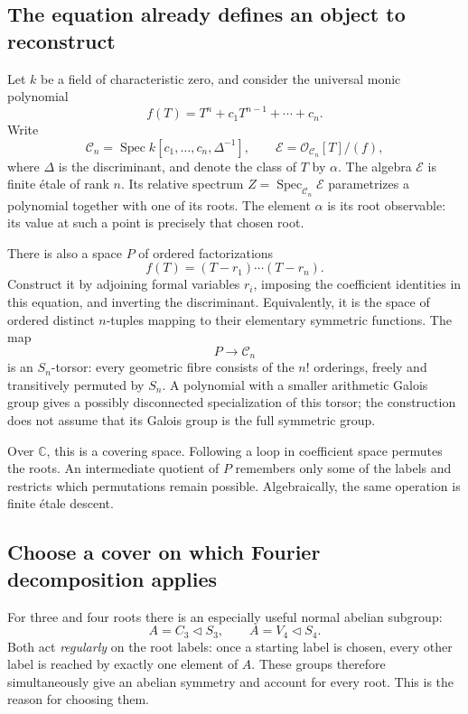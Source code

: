 \documentclass[11pt]{article}
\theoremstyle{remark}
\newcommand{\C}{\mathbb C}
\newcommand{\Spec}{\operatorname{Spec}}
\begin{document}
\subsection{The equation already defines an object to reconstruct}

Let \(k\) be a field of characteristic zero, and consider the universal monic polynomial
\[
f(T)=T^n+c_1T^{n-1}+\cdots+c_n.
\]
Write
\[
\mathcal C_n
=\Spec k[c_1,\ldots,c_n,\Delta^{-1}],
\qquad
\mathcal E=\mathcal O_{\mathcal C_n}[T]/(f),
\]
where \(\Delta\) is the discriminant, and denote the class of \(T\) by \(\alpha\).
The algebra \(\mathcal E\) is finite \'etale of rank \(n\). Its relative spectrum
\(Z=\Spec_{\mathcal C_n}\mathcal E\) parametrizes a polynomial together with one of its roots. The element \(\alpha\) is its root observable: its value at such a point is precisely that chosen root.

There is also a space \(P\) of ordered factorizations
\[
f(T)=(T-r_1)\cdots(T-r_n).
\]
Construct it by adjoining formal variables \(r_i\), imposing the coefficient identities in this equation, and inverting the discriminant. Equivalently, it is the space of ordered distinct \(n\)-tuples mapping to their elementary symmetric functions. The map
\[
P\longrightarrow \mathcal C_n
\]
is an \(S_n\)-torsor: every geometric fibre consists of the \(n!\) orderings, freely and transitively permuted by \(S_n\). A polynomial with a smaller arithmetic Galois group gives a possibly disconnected specialization of this torsor; the construction does not assume that its Galois group is the full symmetric group.

Over \(\C\), this is a covering space. Following a loop in coefficient space permutes the roots. An intermediate quotient of \(P\) remembers only some of the labels and restricts which permutations remain possible. Algebraically, the same operation is finite \'etale descent.

\subsection{Choose a cover on which Fourier decomposition applies}

For three and four roots there is an especially useful normal abelian subgroup:
\[
A=C_3\triangleleft S_3,
\qquad
A=V_4\triangleleft S_4.
\]
Both act \emph{regularly} on the root labels: once a starting label is chosen, every other label is reached by exactly one element of \(A\). These groups therefore simultaneously give an abelian symmetry and account for every root. This is the reason for choosing them.
\end{document}
